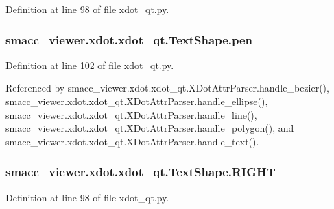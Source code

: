 Definition at line 98 of file xdot\+\_\+qt.\+py.

\subsubsection[{\texorpdfstring{pen}{pen}}]{\setlength{\rightskip}{0pt plus 5cm}smacc\+\_\+viewer.\+xdot.\+xdot\+\_\+qt.\+Text\+Shape.\+pen}\hypertarget{classsmacc__viewer_1_1xdot_1_1xdot__qt_1_1TextShape_aa707273f46372937ec96b59762d82a4f}{}\label{classsmacc__viewer_1_1xdot_1_1xdot__qt_1_1TextShape_aa707273f46372937ec96b59762d82a4f}


Definition at line 102 of file xdot\+\_\+qt.\+py.



Referenced by smacc\+\_\+viewer.\+xdot.\+xdot\+\_\+qt.\+X\+Dot\+Attr\+Parser.\+handle\+\_\+bezier(), smacc\+\_\+viewer.\+xdot.\+xdot\+\_\+qt.\+X\+Dot\+Attr\+Parser.\+handle\+\_\+ellipse(), smacc\+\_\+viewer.\+xdot.\+xdot\+\_\+qt.\+X\+Dot\+Attr\+Parser.\+handle\+\_\+line(), smacc\+\_\+viewer.\+xdot.\+xdot\+\_\+qt.\+X\+Dot\+Attr\+Parser.\+handle\+\_\+polygon(), and smacc\+\_\+viewer.\+xdot.\+xdot\+\_\+qt.\+X\+Dot\+Attr\+Parser.\+handle\+\_\+text().

\subsubsection[{\texorpdfstring{R\+I\+G\+HT}{RIGHT}}]{\setlength{\rightskip}{0pt plus 5cm}smacc\+\_\+viewer.\+xdot.\+xdot\+\_\+qt.\+Text\+Shape.\+R\+I\+G\+HT\hspace{0.3cm}{\ttfamily [static]}}\hypertarget{classsmacc__viewer_1_1xdot_1_1xdot__qt_1_1TextShape_a5e272e4c58112130bddcf25c07debdc7}{}\label{classsmacc__viewer_1_1xdot_1_1xdot__qt_1_1TextShape_a5e272e4c58112130bddcf25c07debdc7}


Definition at line 98 of file xdot\+\_\+qt.\+py.

